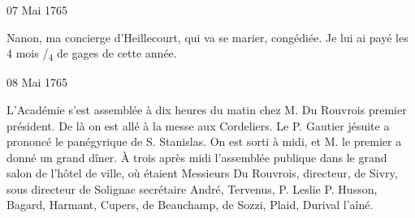                      \begin{diary}{07 Mai 1765}{}


                           Nanon, ma concierge d'Heillecourt, qui
                           va se marier, congédiée. Je lui ai payé
                           les 4 mois /\textsubscript{4} de gages de
                           cette année. \bigskip


                     \end{diary}
                     \begin{diary}{08 Mai 1765}{}


                           L'Académie s'est assemblée à dix
                           heures du
                           matin chez
                           M. Du Rouvrois
                           premier président. De là
                           on est allé à la messe aux Cordeliers. Le P.
                              Gautier
                           jésuite a prononcé le panégyrique de
                           S. Stanislas. On est sorti à midi, et M.
                              le premier a donné un grand dîner. À
                           trois après midi l'assemblée publique dans
                           le grand salon de l'hôtel de
                              ville, où étaient
                           Messieurs
                           Du Rouvrois, directeur, de Sivry, sous directeur
                           de Solignac
                           secrétaire
                           André, Tervenus, P. Leslie
                           P. Husson, Bagard, Harmant, Cupers,
                           de Beauchamp, de Sozzi, Plaid,
                           Durival l'aîné. \bigskip




\end{diary}
